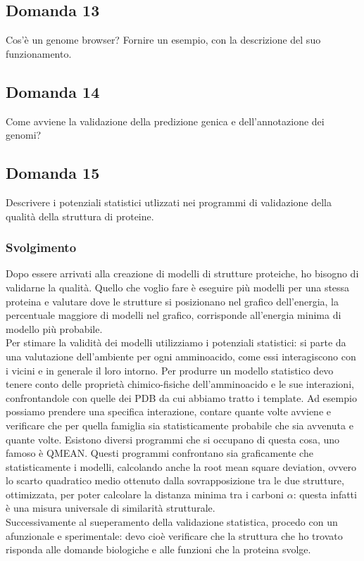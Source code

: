 \documentclass{article}
\begin{document}
\subsection*{Domanda 13}
Cos'è un genome browser? Fornire un esempio, con la descrizione del suo funzionamento.

\subsection*{Domanda 14}
Come avviene la validazione della predizione genica e dell'annotazione dei genomi?

\subsection*{Domanda 15}
Descrivere i potenziali statistici utlizzati nei programmi di validazione della qualità della struttura di proteine.
\subsubsection*{Svolgimento}
Dopo essere arrivati alla creazione di modelli di strutture proteiche, ho bisogno di validarne la qualità. Quello che voglio fare è eseguire più modelli per una stessa proteina e valutare dove le strutture si posizionano nel grafico dell'energia, la percentuale maggiore di modelli nel grafico, corrisponde all'energia minima di modello più probabile.\\
Per stimare la validità dei modelli utilizziamo i potenziali statistici: si parte da una valutazione dell'ambiente per ogni amminoacido, come essi interagiscono con i vicini e in generale il loro intorno. Per produrre un modello statistico devo tenere conto delle proprietà chimico-fisiche dell'amminoacido e le sue interazioni, confrontandole con quelle dei PDB da cui abbiamo tratto i template. 
Ad esempio possiamo prendere una specifica interazione, contare quante volte avviene e verificare che per quella famiglia sia statisticamente probabile che sia avvenuta e quante volte. Esistono diversi programmi che si occupano di questa cosa, uno famoso è QMEAN. Questi programmi confrontano sia graficamente che statisticamente i modelli, calcolando anche la root mean square deviation, ovvero lo scarto quadratico medio ottenuto dalla sovrapposizione 
tra le due strutture, ottimizzata, per poter calcolare la distanza minima tra i carboni $\alpha$: questa infatti è una misura universale di similarità strutturale.\\
Successivamente al sueperamento della validazione statistica, procedo con un afunzionale e sperimentale: devo cioè verificare che la struttura che ho trovato risponda alle domande biologiche e alle funzioni che la proteina svolge.
\end{document}
